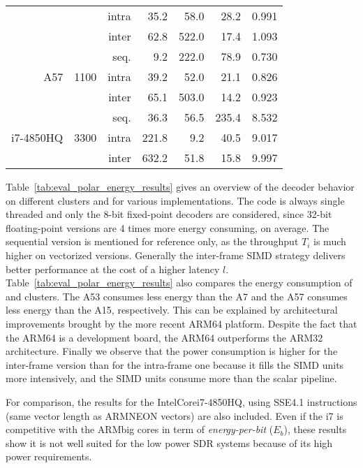 \begin{table}[htp]
\begin{tabular}{r r r r r r r}
                               &                       & intra & 35.2 &   58.0 &  28.2 & 0.991 \\
                               &                       & inter & 62.8 &  522.0 &  17.4 & 1.093 \\
    \hline
    \multirow{3}{*}{A57}       & \multirow{3}{*}{1100} & seq.  &  9.2 &  222.0 &  78.9 & 0.730 \\
                               &                       & intra & 39.2 &   52.0 &  21.1 & 0.826 \\
                               &                       & inter & 65.1 &  503.0 &  14.2 & 0.923 \\
    \hline
    \multirow{3}{*}{i7-4850HQ} & \multirow{3}{*}{3300} & seq.  &  36.3 &   56.5 & 235.4 & 8.532 \\
                               &                       & intra & 221.8 &    9.2 &  40.5 & 9.017 \\
                               &                       & inter & 632.2 &   51.8 &  15.8 & 9.997 \\
  \end{tabular}
\end{table}

Table~\ref{tab:eval_polar_energy_results} gives an overview of the decoder
behavior on different clusters and for various implementations. The code is
always single threaded and only the 8-bit fixed-point decoders are considered,
since 32-bit floating-point versions  are 4 times more energy consuming, on
average. The sequential version is mentioned for reference only, as the
throughput $T_i$ is much higher on vectorized versions. Generally the
inter-frame SIMD strategy delivers better performance at the cost of a higher
latency $l$. Table~\ref{tab:eval_polar_energy_results} also compares the energy
consumption of \little and \big clusters. The A53 consumes less energy than the
A7 and the A57 consumes less energy than the A15, respectively. This can be
explained by architectural improvements brought by the more recent ARM64
platform. Despite the fact that the ARM64 is a development board, the ARM64
outperforms the ARM32 architecture. Finally we observe that the power
consumption is higher for the inter-frame version than for the intra-frame one
because it fills the SIMD units more intensively, and the SIMD units consume
more than the scalar pipeline.

For comparison, the results for the Intel\R Core\TM i7-4850HQ, using SSE4.1
instructions (same vector length as ARM\R NEON vectors) are also included. Even
if the i7 is competitive with the ARM\R big cores in term of
\textit{energy-per-bit} ($E_b$), these results show it is not well suited for
the low power SDR systems because of its high power requirements.

